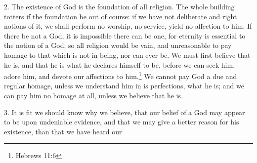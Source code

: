 \documentclass[a5paper]{book}
\begin{document}
2. The existence of God is the foundation of all religion. 
The whole building totters if the foundation be out of course: 
    if we have not deliberate and right notions of it, 
    we shall perform no worship, no service, yield no affection to him. 
If there be not a God, it is impossible there can be one, 
    for eternity is essential to the notion of a God; 
    so all religion would be vain, 
    and unreasonable to pay homage to that which is not in being, 
    nor can ever be. 
We must first believe that he is, 
    and that he is what he declares himself to be, 
    before we can seek him, adore him, and devote our affections to him.\footnote{Hebrews 11:6}
We cannot pay God a due and regular homage, 
    unless we understand him in is perfections, what he is; 
    and we can pay him no homage at all, unless we believe that he is.

3. It is fit we should know why we believe, 
    that our belief of a God may appear to be upon undeniable evidence, 
    and that we may give a better reason for his existence, 
    than that we have heard our

\end{document}

